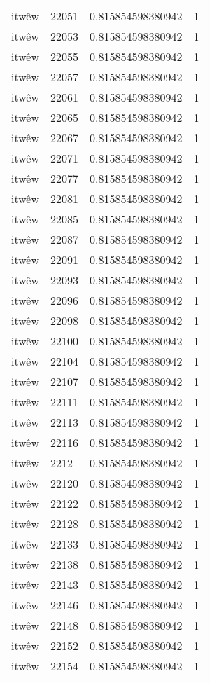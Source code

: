 \begin{longtable}{llll}
itwêw & 22051 & 0.815854598380942 & 1 \\
itwêw & 22053 & 0.815854598380942 & 1 \\
itwêw & 22055 & 0.815854598380942 & 1 \\
itwêw & 22057 & 0.815854598380942 & 1 \\
itwêw & 22061 & 0.815854598380942 & 1 \\
itwêw & 22065 & 0.815854598380942 & 1 \\
itwêw & 22067 & 0.815854598380942 & 1 \\
itwêw & 22071 & 0.815854598380942 & 1 \\
itwêw & 22077 & 0.815854598380942 & 1 \\
itwêw & 22081 & 0.815854598380942 & 1 \\
itwêw & 22085 & 0.815854598380942 & 1 \\
itwêw & 22087 & 0.815854598380942 & 1 \\
itwêw & 22091 & 0.815854598380942 & 1 \\
itwêw & 22093 & 0.815854598380942 & 1 \\
itwêw & 22096 & 0.815854598380942 & 1 \\
itwêw & 22098 & 0.815854598380942 & 1 \\
itwêw & 22100 & 0.815854598380942 & 1 \\
itwêw & 22104 & 0.815854598380942 & 1 \\
itwêw & 22107 & 0.815854598380942 & 1 \\
itwêw & 22111 & 0.815854598380942 & 1 \\
itwêw & 22113 & 0.815854598380942 & 1 \\
itwêw & 22116 & 0.815854598380942 & 1 \\
itwêw & 2212 & 0.815854598380942 & 1 \\
itwêw & 22120 & 0.815854598380942 & 1 \\
itwêw & 22122 & 0.815854598380942 & 1 \\
itwêw & 22128 & 0.815854598380942 & 1 \\
itwêw & 22133 & 0.815854598380942 & 1 \\
itwêw & 22138 & 0.815854598380942 & 1 \\
itwêw & 22143 & 0.815854598380942 & 1 \\
itwêw & 22146 & 0.815854598380942 & 1 \\
itwêw & 22148 & 0.815854598380942 & 1 \\
itwêw & 22152 & 0.815854598380942 & 1 \\
itwêw & 22154 & 0.815854598380942 & 1 \\

\end{longtable}

